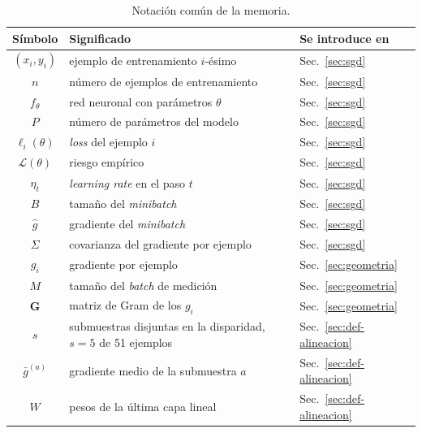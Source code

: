 \begin{table}[!ht]
\centering
\small
\caption{Notación común de la memoria.}
\label{tab:notacion}
\begin{tabular}{cll}
\toprule
\textbf{Símbolo} & \textbf{Significado} & \textbf{Se introduce en} \\
\midrule
$(x_i, y_i)$          & ejemplo de entrenamiento $i$-ésimo                & Sec.~\ref{sec:sgd} \\
$n$                   & número de ejemplos de entrenamiento               & Sec.~\ref{sec:sgd} \\
$f_\theta$            & red neuronal con parámetros $\theta$              & Sec.~\ref{sec:sgd} \\
$P$                   & número de parámetros del modelo                   & Sec.~\ref{sec:sgd} \\
$\ell_i(\theta)$      & \emph{loss} del ejemplo $i$                              & Sec.~\ref{sec:sgd} \\
$\mathcal{L}(\theta)$ & riesgo empírico                                   & Sec.~\ref{sec:sgd} \\
$\eta_t$              & \emph{learning rate} en el paso $t$                & Sec.~\ref{sec:sgd} \\
$B$                   & tamaño del \emph{minibatch}                              & Sec.~\ref{sec:sgd} \\
$\hat{g}$             & gradiente del \emph{minibatch}                           & Sec.~\ref{sec:sgd} \\
$\Sigma$              & covarianza del gradiente por ejemplo              & Sec.~\ref{sec:sgd} \\
$g_i$                 & gradiente por ejemplo                             & Sec.~\ref{sec:geometria} \\
$M$                   & tamaño del \emph{batch} de medición                   & Sec.~\ref{sec:geometria} \\
$\mathbf{G}$          & matriz de Gram de los $g_i$                       & Sec.~\ref{sec:geometria} \\
$s$                   & submuestras disjuntas en la disparidad, $s = 5$ de 51 ejemplos & Sec.~\ref{sec:def-alineacion} \\
$\bar{g}^{(a)}$       & gradiente medio de la submuestra $a$              & Sec.~\ref{sec:def-alineacion} \\
$W$                   & pesos de la última capa lineal                    & Sec.~\ref{sec:def-alineacion} \\

\end{tabular}
\end{table}
